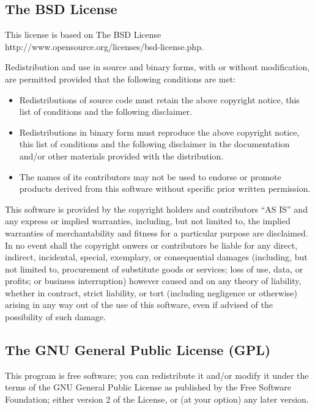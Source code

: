 \documentclass{article}
\begin{document}
\subsection{The BSD License}

This license is based on
\htmladdnormallinkfoot
{The BSD License}
{http://www.opensource.org/licenses/bsd-license.php}.

Redistribution and use in source and binary forms, with or without 
modification, are permitted provided that the following conditions are met:

\begin{itemize}
\item
Redistributions of source code must retain the above copyright notice, 
this list of conditions and the following disclaimer.
\item
Redistributions in binary form must reproduce the above copyright notice, 
this list of conditions and the following disclaimer in the documentation 
and/or other materials provided with the distribution.
\item
The names of its contributors may not be used to endorse or promote 
products derived from this software without specific prior written permission.
\end{itemize}

\begin{sc}
This software is provided by the copyright holders and contributors ``AS IS'' 
and any express or implied warranties, including, but not limited to, 
the implied warranties of merchantability and fitness for a particular 
purpose are disclaimed. In no event shall the copyright onwers or
contributors be liable for any direct, indirect, incidental, special,
exemplary, or consequential damages (including, but not limited to,
procurement of substitute goods or services; loss of use, data, or profits;
or business interruption) however caused and on any theory of liability,
whether in contract, strict liability, or tort (including negligence or
otherwise) arising in any way out of the use of this software,
even if advised of the possibility of such damage.
\end{sc}

\subsection{The GNU General Public License (GPL)}

This program is free software; you can redistribute it and/or modify it under the terms of the GNU General Public License as published by the Free Software Foundation; either version 2 of the License, or (at your option) any later version.
\end{document}
